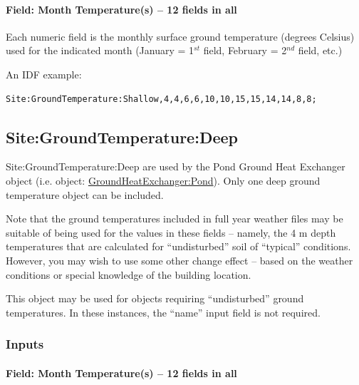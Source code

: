 \paragraph{Field: Month Temperature(s) -- 12 fields in all}\label{field-month-temperatures-12-fields-in-all-1}

Each numeric field is the monthly surface ground temperature (degrees Celsius) used for the indicated month (January = 1\(^{st}\) field, February = 2\(^{nd}\) field, etc.)

An IDF example:

\begin{lstlisting}
Site:GroundTemperature:Shallow,4,4,6,6,10,10,15,15,14,14,8,8;
\end{lstlisting}

\subsection{Site:GroundTemperature:Deep}\label{sitegroundtemperaturedeep}

Site:GroundTemperature:Deep are used by the Pond Ground Heat Exchanger object (i.e. object: \hyperref[groundheatexchangerpond]{GroundHeatExchanger:Pond}). Only one deep ground temperature object can be included.

\begin{callout}
Note that the ground temperatures included in full year weather files may be suitable of being used for the values in these fields -- namely, the 4 m depth temperatures that are calculated for ``undisturbed'' soil of ``typical'' conditions. However, you may wish to use some other change effect -- based on the weather conditions or special knowledge of the building location.
\end{callout}

This object may be used for objects requiring ``undisturbed'' ground temperatures. In these instances, the ``name'' input field is not required.

\subsubsection{Inputs}\label{inputs-13-007}

\paragraph{Field: Month Temperature(s) -- 12 fields in all}\label{field-month-temperatures-12-fields-in-all-2}

